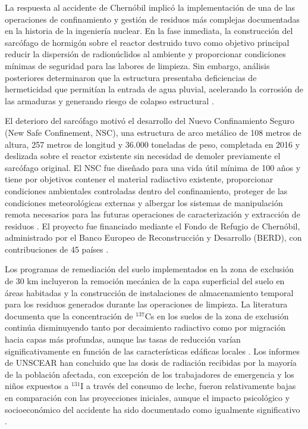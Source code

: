 La respuesta al accidente de Chernóbil implicó la implementación de una de las
operaciones de confinamiento y gestión de residuos más complejas documentadas en
la historia de la ingeniería nuclear. En la fase inmediata, la construcción del
sarcófago de hormigón sobre el reactor destruido tuvo como objetivo principal
reducir la dispersión de radionúclidos al ambiente y proporcionar condiciones
mínimas de seguridad para las labores de limpieza. Sin embargo, análisis
posteriores determinaron que la estructura presentaba deficiencias de hermeticidad
que permitían la entrada de agua pluvial, acelerando la corrosión de las armaduras
y generando riesgo de colapso estructural \cite{EBRD2006}.

El deterioro del sarcófago motivó el desarrollo del Nuevo Confinamiento Seguro
(New Safe Confinement, NSC), una estructura de arco metálico de 108 metros de
altura, 257 metros de longitud y 36.000 toneladas de peso, completada en 2016 y
deslizada sobre el reactor existente sin necesidad de demoler previamente el
sarcófago original. El NSC fue diseñado para una vida útil mínima de 100 años
y tiene por objetivos contener el material radiactivo existente, proporcionar
condiciones ambientales controladas dentro del confinamiento, proteger de las
condiciones meteorológicas externas y albergar los sistemas de manipulación
remota necesarios para las futuras operaciones de caracterización y extracción
de residuos \cite{EBRD2006}. El proyecto fue financiado mediante el Fondo de
Refugio de Chernóbil, administrado por el Banco Europeo de Reconstrucción y
Desarrollo (BERD), con contribuciones de 45 países \cite{EBRD2006}.

Los programas de remediación del suelo implementados en la zona de exclusión de
30 km incluyeron la remoción mecánica de la capa superficial del suelo en áreas
habitadas y la construcción de instalaciones de almacenamiento temporal para los
residuos generados durante las operaciones de limpieza. La literatura documenta
que la concentración de $^{137}$Cs en los suelos de la zona de exclusión continúa
disminuyendo tanto por decaimiento radiactivo como por migración hacia capas más
profundas, aunque las tasas de reducción varían significativamente en función de
las características edáficas locales \cite{Konoplev}. Los informes de UNSCEAR
han concluido que las dosis de radiación recibidas por la mayoría de la población
afectada, con excepción de los trabajadores de emergencia y los niños expuestos
a $^{131}$I a través del consumo de leche, fueron relativamente bajas en
comparación con las proyecciones iniciales, aunque el impacto psicológico y
socioeconómico del accidente ha sido documentado como igualmente significativo
\cite{UNSCEAR2008}.

